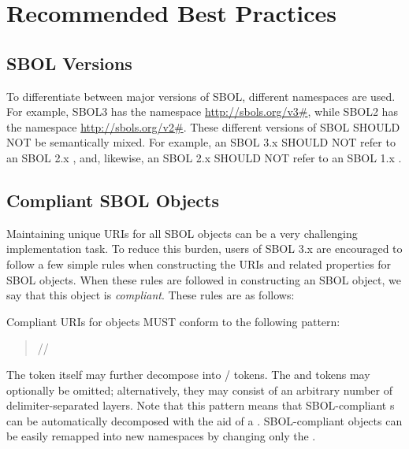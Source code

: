 \section{Recommended Best Practices}
\label{sec:bestpractices}
\subsection{SBOL Versions}

To differentiate between major versions of SBOL, different namespaces are used.  For example, SBOL3 has the namespace \url{http://sbols.org/v3#}, while SBOL2 has the namespace \url{http://sbols.org/v2#}.  These different versions of SBOL SHOULD NOT be semantically mixed. For example, an SBOL 3.x  SHOULD NOT refer to an SBOL 2.x , and, likewise, an SBOL 2.x  SHOULD NOT refer to an SBOL 1.x .

\subsection{Compliant SBOL Objects}
\label{sec:compliant}

Maintaining unique URIs for all SBOL objects can be a very challenging implementation task.  To reduce this burden, users of SBOL 3.x are encouraged to follow a few simple rules when constructing the URIs and related properties for SBOL objects.  When these rules are followed in constructing an SBOL object, we say that this object is \emph{compliant}. These rules are as follows:

Compliant URIs for  objects MUST conform to the following pattern:
\begin{quotation} 
//
\end{quotation}

The  token itself may further decompose into / tokens. The  and  tokens may optionally be omitted; alternatively, they may consist of an arbitrary number of delimiter-separated layers. Note that this pattern means that SBOL-compliant s can be automatically decomposed with the aid of a . SBOL-compliant objects can be easily remapped into new namespaces by changing only the .

